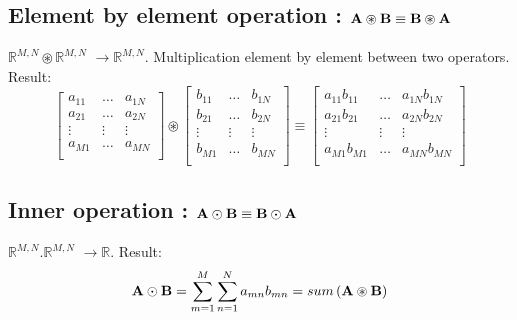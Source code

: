 \documentclass[11pt]{article}
\newcommand{\MATRIX}[1]{\mathbf{\uppercase{#1}}}
\newcommand{\mulebe}{\circledast}
\newcommand{\mulinner}{\odot}
\newcommand{\dimsep}{,}
\begin{document}
\subsection{Element by element operation : $\MATRIX{A}\mulebe  \MATRIX{B}\equiv \MATRIX{B}\mulebe \MATRIX{A} $}
$\mathbb{R}^{M\dimsep N}\mulebe \mathbb{R}^{M\dimsep N}$ $\rightarrow \mathbb{R}^{M\dimsep N}$.
Multiplication element by element 
  between two operators.
Result: 
\begin{equation}
  \left[
 \begin{matrix}
 a_{11} &\hdots &a_{1N}\\ 
 a_{21} &\hdots &a_{2N}\\
 \vdots &\vdots &\vdots\\ 
 a_{M1} &\hdots &a_{MN}\\ 
 \end{matrix}
 \right]\mulebe 
   \left[
 \begin{matrix}
 b_{11} &\hdots &b_{1N}\\ 
 b_{21} &\hdots &b_{2N}\\
 \vdots &\vdots &\vdots\\ 
 b_{M1} &\hdots &b_{MN}\\ 
 \end{matrix}
 \right]
 \equiv \left[
 \begin{matrix}
 a_{11} b_{11} &\hdots &a_{1N} b_{1N}\\ 
 a_{21} b_{21} &\hdots &a_{2N} b_{2N}\\
 \vdots &\vdots &\vdots\\ 
 a_{M1} b_{M1} &\hdots &a_{MN} b_{MN}\\ 
 \end{matrix}
 \right]
 \end{equation}

\subsection{Inner operation : $\MATRIX{A}\mulinner \MATRIX{B}\equiv \MATRIX{B}\mulinner \MATRIX{A} $}
$\mathbb{R}^{M\dimsep N}. \mathbb{R}^{M\dimsep N}$ $\rightarrow \mathbb{R}$.
Result: 
  \begin{equation}
\MATRIX{A}\mulinner \MATRIX{B} = \sum \limits_{m=1}^{M}\sum \limits_{n=1}^{N} {a_{mn} b_{mn}} = sum\left(\MATRIX{A}\mulebe  \MATRIX{B}\right)
  \end{equation}
  
\end{document}
